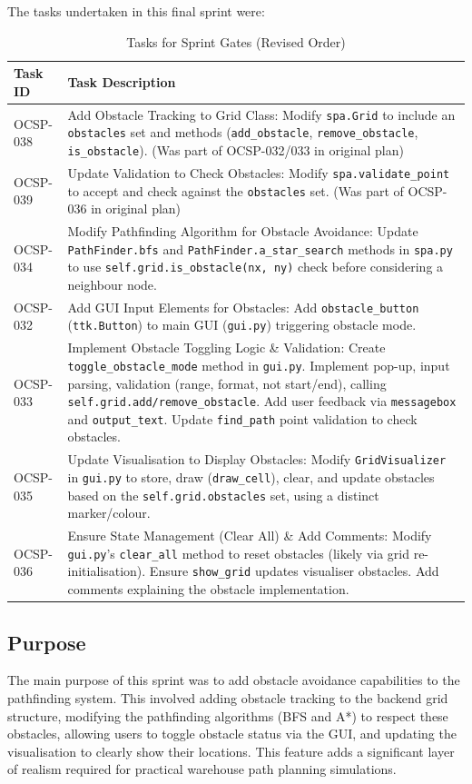 The tasks undertaken in this final sprint were:
\begin{table}[htbp]
	\centering
	\begin{tabularx}{\textwidth}{|l|X|}
		\hline
		\textbf{Task ID} & \textbf{Task Description} \\
		\hline
		OCSP-038 & Add Obstacle Tracking to Grid Class: Modify \verb|spa.Grid| to include an \verb|obstacles| set and methods (\verb|add_obstacle|, \verb|remove_obstacle|, \verb|is_obstacle|). (Was part of OCSP-032/033 in original plan) \\
		\hline
		OCSP-039 & Update Validation to Check Obstacles: Modify \verb|spa.validate_point| to accept and check against the \verb|obstacles| set. (Was part of OCSP-036 in original plan) \\
		\hline
		OCSP-034 & Modify Pathfinding Algorithm for Obstacle Avoidance: Update \verb|PathFinder.bfs| and \verb|PathFinder.a_star_search| methods in \verb|spa.py| to use \verb|self.grid.is_obstacle(nx, ny)| check before considering a neighbour node. \\
		\hline
		OCSP-032 & Add GUI Input Elements for Obstacles: Add \verb|obstacle_button| (\verb|ttk.Button|) to main GUI (\verb|gui.py|) triggering obstacle mode. \\
		\hline
		OCSP-033 & Implement Obstacle Toggling Logic \& Validation: Create \verb|toggle_obstacle_mode| method in \verb|gui.py|. Implement pop-up, input parsing, validation (range, format, not start/end), calling \verb|self.grid.add/remove_obstacle|. Add user feedback via \verb|messagebox| and \verb|output_text|. Update \verb|find_path| point validation to check obstacles. \\
		\hline
		OCSP-035 & Update Visualisation to Display Obstacles: Modify \verb|GridVisualizer| in \verb|gui.py| to store, draw (\verb|draw_cell|), clear, and update obstacles based on the \verb|self.grid.obstacles| set, using a distinct marker/colour. \\
		\hline
		OCSP-036 & Ensure State Management (Clear All) \& Add Comments: Modify \verb|gui.py|'s \verb|clear_all| method to reset obstacles (likely via grid re-initialisation). Ensure \verb|show_grid| updates visualiser obstacles. Add comments explaining the obstacle implementation. \\
		\hline
	\end{tabularx}
	\caption{Tasks for Sprint Gates (Revised Order)}
\end{table}

\subsection{Purpose}
The main purpose of this sprint was to add obstacle avoidance capabilities to the pathfinding system. This involved adding obstacle tracking to the backend grid structure, modifying the pathfinding algorithms (BFS and A*) to respect these obstacles, allowing users to toggle obstacle status via the GUI, and updating the visualisation to clearly show their locations. This feature adds a significant layer of realism required for practical warehouse path planning simulations.

